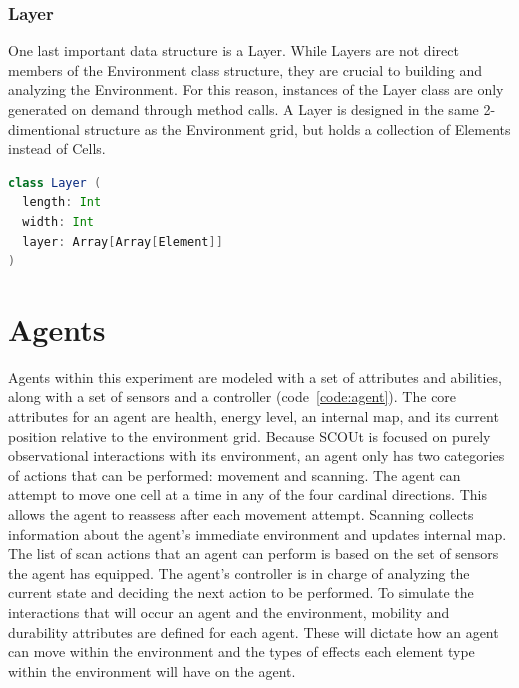 \subsubsection{Layer} \label{subsec:layer}
One last important data structure is a Layer.
While Layers are not direct members of the Environment class structure, they are crucial to building and analyzing the Environment.
For this reason, instances of the Layer class are only generated on demand through method calls.
A Layer is designed in the same 2-dimentional structure as the Environment grid, but holds a collection of Elements instead of Cells.

\begin{lstlisting}[language=Scala]
class Layer (
  length: Int
  width: Int
  layer: Array[Array[Element]]
)
\end{lstlisting}



\section{Agents} \label{sec:agent}
Agents within this experiment are modeled with a set of attributes and abilities, along with a set of sensors and a controller (code~\ref{code:agent}).
The core attributes for an agent are health, energy level, an internal map, and its current position relative to the environment grid.
Because SCOUt is focused on purely observational interactions with its environment, an agent only has two categories of actions that can be performed: movement and scanning.
The agent can attempt to move one cell at a time in any of the four cardinal directions.
This allows the agent to reassess after each movement attempt.
Scanning collects information about the agent's immediate environment and updates internal map.
The list of scan actions that an agent can perform is based on the set of sensors the agent has equipped.
The agent's controller is in charge of analyzing the current state and deciding the next action to be performed.
To simulate the interactions that will occur an agent and the environment, mobility and durability attributes are defined for each agent.
These will dictate how an agent can move within the environment and the types of effects each element type within the environment will have on the agent.

